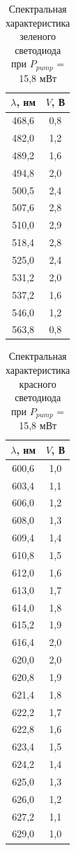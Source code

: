 \documentclass[a4paper,12pt]{report}
\begin{document}
\begin{table}[H]
\begin{tabular}{|c|c|}
\hline
$\lambda$, нм & $V$, В \\ \hline
468,6      & 0,8  \\ \hline
482,0        & 1,2  \\ \hline
489,2      & 1,6  \\ \hline
494,8      & 2,0    \\ \hline
500,5      & 2,4  \\ \hline
507,6      & 2,8  \\ \hline
510,0        & 2,9  \\ \hline
518,4      & 2,8  \\ \hline
525,0        & 2,4  \\ \hline
531,2      & 2,0    \\ \hline
537,2      & 1,6  \\ \hline
546,0        & 1,2  \\ \hline
563,8      & 0,8  \\ \hline
\end{tabular}
\caption{Спектральная характеристика зеленого светодиода при $P_{pump}$ = 15,8 мВт}
\label{tab.6}
\end{table}

\begin{table}[H]
\begin{tabular}{|c|c|}
\hline
$\lambda$, нм & $V$, В \\ \hline
600,6      & 1,0    \\ \hline
603,4      & 1,1  \\ \hline
606,0        & 1,2  \\ \hline
608,0        & 1,3  \\ \hline
609,4      & 1,4  \\ \hline
610,8      & 1,5  \\ \hline
612,0        & 1,6  \\ \hline
613,0        & 1,7  \\ \hline
614,0        & 1,8  \\ \hline
615,2      & 1,9  \\ \hline
616,4      & 2,0    \\ \hline
620,0        & 2,0    \\ \hline
620,8      & 1,9  \\ \hline
621,4      & 1,8  \\ \hline
622,2      & 1,7  \\ \hline
622,8      & 1,6  \\ \hline
623,4      & 1,5  \\ \hline
624,2      & 1,4  \\ \hline
625,0        & 1,3  \\ \hline
626,0        & 1,2  \\ \hline
627,2      & 1,1  \\ \hline
629,0        & 1,0    \\ \hline
\end{tabular}
\caption{Спектральная характеристика красного светодиода при $P_{pump}$ = 15,8 мВт}
\label{tab.7}
\end{table}
\end{document}
